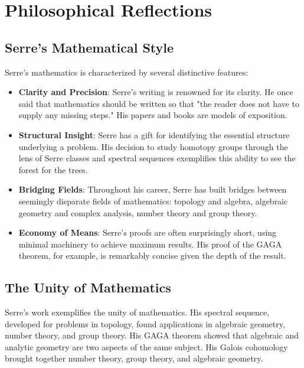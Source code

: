 \section{Philosophical Reflections}

\subsection{Serre's Mathematical Style}

Serre's mathematics is characterized by several distinctive features:

\begin{itemize}
\item \textbf{Clarity and Precision}: Serre's writing is renowned for its clarity. He once said that mathematics should be written so that "the reader does not have to supply any missing steps." His papers and books are models of exposition.

\item \textbf{Structural Insight}: Serre has a gift for identifying the essential structure underlying a problem. His decision to study homotopy groups through the lens of Serre classes and spectral sequences exemplifies this ability to see the forest for the trees.

\item \textbf{Bridging Fields}: Throughout his career, Serre has built bridges between seemingly disparate fields of mathematics: topology and algebra, algebraic geometry and complex analysis, number theory and group theory.

\item \textbf{Economy of Means}: Serre's proofs are often surprisingly short, using minimal machinery to achieve maximum results. His proof of the GAGA theorem, for example, is remarkably concise given the depth of the result.
\end{itemize}

\subsection{The Unity of Mathematics}

Serre's work exemplifies the unity of mathematics. His spectral sequence, developed for problems in topology, found applications in algebraic geometry, number theory, and group theory. His GAGA theorem showed that algebraic and analytic geometry are two aspects of the same subject. His Galois cohomology brought together number theory, group theory, and algebraic geometry.


